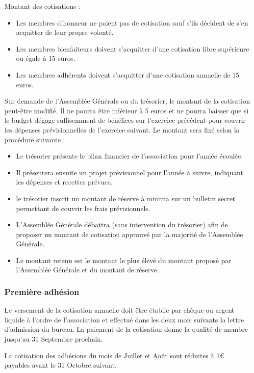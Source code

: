 \documentclass[a4paper,french,10pt]{article}
\begin{document}
Montant des cotisations :

\begin{itemize}
\item Les membres d'honneur ne paient pas de cotisation sauf s'ils décident de s'en acquitter de leur propre volonté.
\item Les membres bienfaiteurs doivent s'acquitter d'une cotisation libre supérieure ou égale à 15 euros.
\item Les membres adhérents doivent s'acquitter d'une cotisation annuelle de 15 euros.
\end{itemize}


Sur demande de l'Assemblée Générale ou du trésorier, le montant de la cotisation peut-être modifié. Il ne pourra être inférieur à 5 euros et ne pourra baisser que si le budget dégage suffisemment de bénéfices sur l'exercice précédent pour couvrir les dépenses prévisionnelles de l'exercice suivant. Le montant sera fixé selon la procédure suivante :
\begin{itemize}
\item Le trésorier présente le bilan financier de l'association pour l'année écoulée.
\item Il présentera ensuite un projet prévisionnel pour l'année à suivre, indiquant les dépenses et recettes prévues.
\item le trésorier inscrit un montant de réserve à minima sur un bulletin secret permettant de couvrir les frais prévisionnels.
\item L'Assemblée Générale débattra (sans intervention du trésorier) afin de proposer un montant de cotisation approuvé par la majorité de l'Assemblée Générale.
\item Le montant retenu est le montant le plus élevé du montant proposé par l'Assemblée Générale et du montant de réserve.
\end{itemize}

\subsubsection*{Première adhésion}

Le versement de la cotisation annuelle doit être établie par chèque ou argent liquide à l'ordre de l'association et effectué dans les deux mois suivants la lettre d'admission du bureau. La paiement de la cotisation donne la qualité de membre jusqu'au 31 Septembre prochain.

La cotisation des adhésions du mois de Juillet et Août sont réduites à 1\euro{} payables avant le 31 Octobre suivant.
\end{document}
